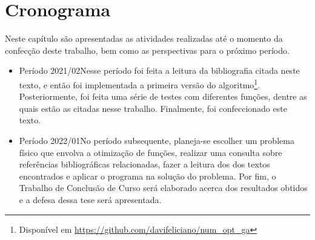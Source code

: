 \chapter{Cronograma}\label{cap_cronograma}

Neste capítulo são apresentadas as atividades realizadas até o momento da confecção deste
trabalho, bem como as perspectivas para o próximo período.

\begin{itemize}
  \item Período 2021/02\trav Nesse período foi feita a leitura da bibliografia citada neste
        texto, e então foi implementada a primeira versão do algoritmo\footnote{
          Disponível em \url{https://github.com/davifeliciano/num_opt_ga}
        }. Posteriormente, foi feita uma série de testes com diferentes funções, dentre as quais
        estão as citadas nesse trabalho. Finalmente, foi confeccionado este texto.
  \item Período 2022/01\trav No período subsequente, planeja-se escolher um problema físico
        que envolva a otimização de funções, realizar uma consulta sobre referências bibliográficas
        relacionadas, fazer a leitura dos dos textos encontrados e aplicar o programa na solução
        do problema. Por fim, o Trabalho de Conclusão de Curso será elaborado acerca dos
        resultados obtidos e a defesa dessa tese será apresentada.
\end{itemize}
